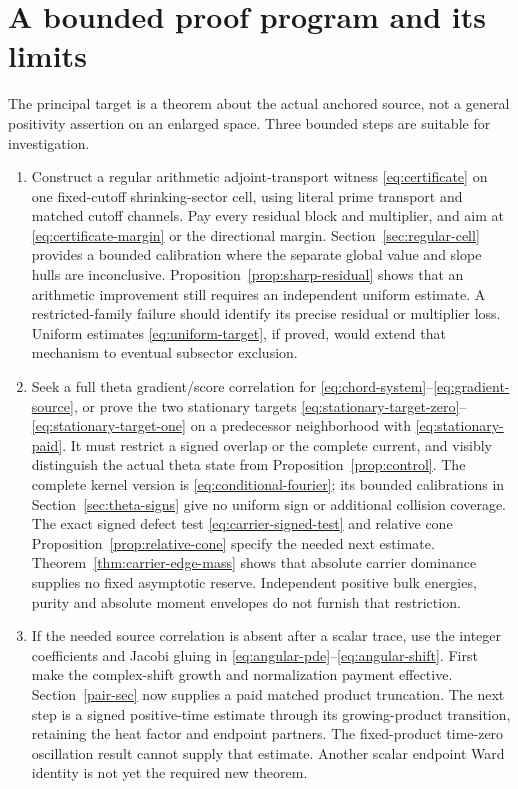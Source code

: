 \documentclass[11pt]{article}
\theoremstyle{definition}
\theoremstyle{remark}
\begin{document}
\section{A bounded proof program and its limits}
\label{sec:program}

The principal target is a theorem about the actual anchored source,
not a general positivity assertion on an enlarged space. Three bounded
steps are suitable for investigation.
\begin{enumerate}
 \item Construct a regular arithmetic adjoint-transport witness
 \eqref{eq:certificate} on one fixed-cutoff shrinking-sector cell, using
 literal prime transport and matched cutoff channels. Pay every residual
 block and multiplier, and aim at \eqref{eq:certificate-margin} or the
 directional margin. Section~\ref{sec:regular-cell} provides a bounded
 calibration where the separate global value and slope hulls are
 inconclusive. Proposition~\ref{prop:sharp-residual} shows that an
 arithmetic improvement still requires an independent uniform estimate.
 A restricted-family failure should identify its precise residual or
 multiplier loss. Uniform estimates \eqref{eq:uniform-target}, if proved,
 would extend that mechanism to eventual subsector exclusion.
 \item Seek a full theta gradient/score correlation for
 \eqref{eq:chord-system}--\eqref{eq:gradient-source}, or prove the two
 stationary targets \eqref{eq:stationary-target-zero}--\eqref{eq:stationary-target-one}
 on a predecessor neighborhood with \eqref{eq:stationary-paid}. It must restrict a
 signed overlap or the complete current, and visibly distinguish the
 actual theta state from Proposition~\ref{prop:control}. The complete
 kernel version is \eqref{eq:conditional-fourier}; its bounded
 calibrations in Section~\ref{sec:theta-signs} give no uniform sign
 or additional collision coverage. The exact signed defect test
 \eqref{eq:carrier-signed-test} and relative cone
 Proposition~\ref{prop:relative-cone} specify the needed next estimate.
 Theorem~\ref{thm:carrier-edge-mass} shows that absolute carrier dominance
 supplies no fixed asymptotic reserve. Independent positive bulk energies,
 purity and absolute moment envelopes do not furnish that restriction.
 \item If the needed source correlation is absent after a scalar trace,
 use the integer coefficients and Jacobi gluing in
 \eqref{eq:angular-pde}--\eqref{eq:angular-shift}. First make the
 complex-shift growth and normalization payment effective.
 Section~\ref{pair-sec} now supplies a paid matched
 product truncation. The next step is a signed positive-time estimate
 through its growing-product transition, retaining the heat factor and
 endpoint partners. The fixed-product time-zero oscillation result
 cannot supply that estimate. Another scalar endpoint Ward identity is
 not yet the required new theorem.
\end{enumerate}
\end{document}

